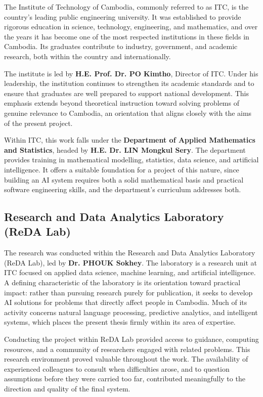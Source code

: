 \hs The Institute of Technology of Cambodia, commonly referred to as ITC, is the
country's leading public engineering university. It was established to provide rigorous
education in science, technology, engineering, and mathematics, and over the years it
has become one of the most respected institutions in these fields in Cambodia. Its
graduates contribute to industry, government, and academic research, both within the
country and internationally.

\hs The institute is led by \textbf{H.E. Prof. Dr. PO Kimtho}, Director of ITC. Under
his leadership, the institution continues to strengthen its academic standards and to
ensure that graduates are well prepared to support national development. This emphasis
extends beyond theoretical instruction toward solving problems of genuine relevance to
Cambodia, an orientation that aligns closely with the aims of the present project.

\hs Within ITC, this work falls under the \textbf{Department of Applied Mathematics and
Statistics}, headed by \textbf{H.E. Dr. LIN Mongkul Sery}. The department provides
training in mathematical modelling, statistics, data science, and artificial
intelligence. It offers a suitable foundation for a project of this nature, since
building an AI system requires both a solid mathematical basis and practical software
engineering skills, and the department's curriculum addresses both.

\subsection{Research and Data Analytics Laboratory (ReDA Lab)}

\hs The research was conducted within the Research and Data Analytics Laboratory (ReDA
Lab), led by \textbf{Dr. PHOUK Sokhey}. The laboratory is a research unit at ITC focused
on applied data science, machine learning, and artificial intelligence. A defining
characteristic of the laboratory is its orientation toward practical impact: rather than
pursuing research purely for publication, it seeks to develop AI solutions for problems
that directly affect people in Cambodia. Much of its activity concerns natural language
processing, predictive analytics, and intelligent systems, which places the present
thesis firmly within its area of expertise.

\hs Conducting the project within ReDA Lab provided access to guidance, computing
resources, and a community of researchers engaged with related problems. This research
environment proved valuable throughout the work. The availability of experienced
colleagues to consult when difficulties arose, and to question assumptions before they
were carried too far, contributed meaningfully to the direction and quality of the final
system.

